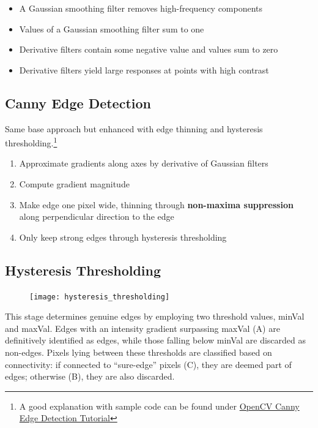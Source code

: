 \begin{itemize}
	\item A Gaussian smoothing filter removes high-frequency components
	\item Values of a Gaussian smoothing filter sum to one
	\item Derivative filters contain some negative value and values sum to zero
	\item Derivative filters yield large responses at points with high contrast
\end{itemize}

\subsection{Canny Edge Detection}
Same base approach but enhanced with edge thinning and hysteresis thresholding.\footnote{A good explanation with sample code can be
found under \href{https://docs.opencv.org/4.3.0/da/d22/tutorial_py_canny.html}{OpenCV Canny Edge Detection Tutorial}}
\begin{enumerate}
	\item Approximate gradients along axes by derivative of Gaussian filters
	\item Compute gradient magnitude
	\item Make edge one pixel wide, thinning through \textbf{non-maxima suppression} along perpendicular direction to the edge
	\item Only keep strong edges through hysteresis thresholding
\end{enumerate}

\subsection{Hysteresis Thresholding}

\begin{figure}
	\centering
	\vspace{-16mm}
	\texttt{[image: hysteresis\_thresholding]}
	\vspace{-20mm}
\end{figure}

This stage determines genuine edges by employing two threshold values, minVal and maxVal.
Edges with an intensity gradient surpassing maxVal (A) are definitively identified as edges,
while those falling below minVal are discarded as non-edges.
Pixels lying between these thresholds are classified based on connectivity:
if connected to ``sure-edge'' pixels (C), they are deemed part of edges; otherwise (B), they are also discarded.

